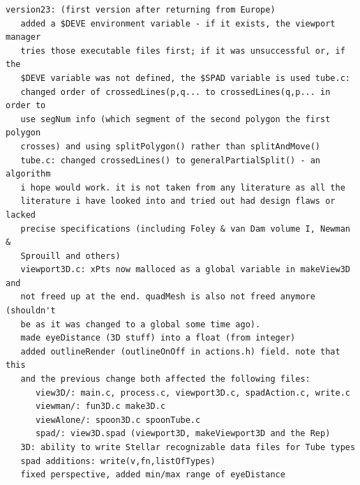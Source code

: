 \documentclass{article}
\begin{document}
\begin{verbatim}
version23: (first version after returning from Europe)
   added a $DEVE environment variable - if it exists, the viewport manager
   tries those executable files first; if it was unsuccessful or, if the
   $DEVE variable was not defined, the $SPAD variable is used tube.c:
   changed order of crossedLines(p,q... to crossedLines(q,p... in order to
   use segNum info (which segment of the second polygon the first polygon
   crosses) and using splitPolygon() rather than splitAndMove()
   tube.c: changed crossedLines() to generalPartialSplit() - an algorithm
   i hope would work. it is not taken from any literature as all the
   literature i have looked into and tried out had design flaws or lacked
   precise specifications (including Foley & van Dam volume I, Newman &
   Sprouill and others)
   viewport3D.c: xPts now malloced as a global variable in makeView3D and
   not freed up at the end. quadMesh is also not freed anymore (shouldn't
   be as it was changed to a global some time ago).
   made eyeDistance (3D stuff) into a float (from integer)
   added outlineRender (outlineOnOff in actions.h) field. note that this
   and the previous change both affected the following files:
      view3D/: main.c, process.c, viewport3D.c, spadAction.c, write.c
      viewman/: fun3D.c make3D.c
      viewAlone/: spoon3D.c spoonTube.c
      spad/: view3D.spad (viewport3D, makeViewport3D and the Rep)
   3D: ability to write Stellar recognizable data files for Tube types
   spad additions: write(v,fn,listOfTypes)
   fixed perspective, added min/max range of eyeDistance


\end{verbatim}
\end{document}
